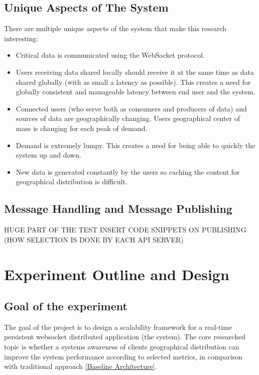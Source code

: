\documentclass{uvamscse}
\begin{document}
\section{Unique Aspects of The System}

There are multiple unique aspects of the system that make this research interesting:

\begin{itemize}
  \item Critical data is communicated using the WebSocket protocol.
  \item Users receiving data shared locally should receive it at the same time as data shared globally (with as small a latency as possible). This creates a need for globally consistent and manageable latency between end user and the system.
  \item Connected users (who serve both as consumers and producers of data) and sources of data are geographically changing. Users geographical center of mass is changing for each peak of demand.
  \item Demand is extremely lumpy. This creates a need for being able to quickly the system up and down.
  \item New data is generated constantly by the users so caching the content for geographical distribution is difficult.
\end{itemize}

\section{Message Handling and Message Publishing}
HUGE PART OF THE TEST
INSERT CODE SNIPPETS ON PUBLISHING (HOW SELECTION IS DONE BY EACH API SERVER)



\chapter{Experiment Outline and Design} \label{Experiment Outline and Design}

\section{Goal of the experiment}

The goal of the project is to design a scalability framework for a real-time persistent websocket distributed application (the system). The core researched topic is whether a systems awareness of clients geographical distribution can improve the system performance according to selected metrics, in comparison with traditional approach \ref{Baseline Architecture}.
\end{document}
